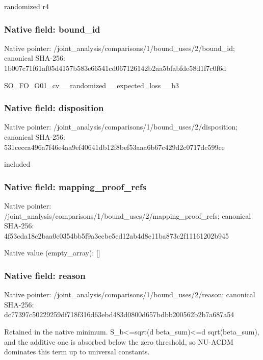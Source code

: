 \documentclass[10pt,a4paper]{article}
\begin{document}
\begingroup\raggedright\sloppy randomized r4\par\endgroup

\subsubsection{Native field: bound\_\allowbreak{}id}
Native pointer: /joint\_\allowbreak{}analysis/comparisons/1/bound\_\allowbreak{}uses/2/bound\_\allowbreak{}id; canonical SHA-256: 1b007c71f61af05d4157b583e66541cd067126142b2aa5bfabfde58d1f7c0f6d

\begingroup\raggedright\sloppy SO\_\allowbreak{}FO\_\allowbreak{}O01\_\allowbreak{}cv\_\allowbreak{}\_\allowbreak{}randomized\_\allowbreak{}\_\allowbreak{}expected\_\allowbreak{}loss\_\allowbreak{}\_\allowbreak{}b3\par\endgroup

\subsubsection{Native field: disposition}
Native pointer: /joint\_\allowbreak{}analysis/comparisons/1/bound\_\allowbreak{}uses/2/disposition; canonical SHA-256: 531cecca496a7f46e4aa9ef40641db12f8bef53aaa6b67c429d2c0717dc599ce

\begingroup\raggedright\sloppy included\par\endgroup

\subsubsection{Native field: mapping\_\allowbreak{}proof\_\allowbreak{}refs}
Native pointer: /joint\_\allowbreak{}analysis/comparisons/1/bound\_\allowbreak{}uses/2/mapping\_\allowbreak{}proof\_\allowbreak{}refs; canonical SHA-256: 4f53cda18c2baa0c0354bb5f9a3ecbe5ed12ab4d8e11ba873c2f11161202b945

Native value (empty\_\allowbreak{}array): []

\subsubsection{Native field: reason}
Native pointer: /joint\_\allowbreak{}analysis/comparisons/1/bound\_\allowbreak{}uses/2/reason; canonical SHA-256: dc77397c50229259df718f316d63ebd483d0800d657bdbb200562b2b7a687a54

\begingroup\raggedright\sloppy Retained in the native minimum. S\_\allowbreak{}b<=\allowbreak{}sqrt(d beta\_\allowbreak{}sum)<=\allowbreak{}d sqrt(beta\_\allowbreak{}sum),\allowbreak{} and the additive one is absorbed below the zero threshold,\allowbreak{} so NU-ACDM dominates this term up to universal constants.\par\endgroup
\end{document}
